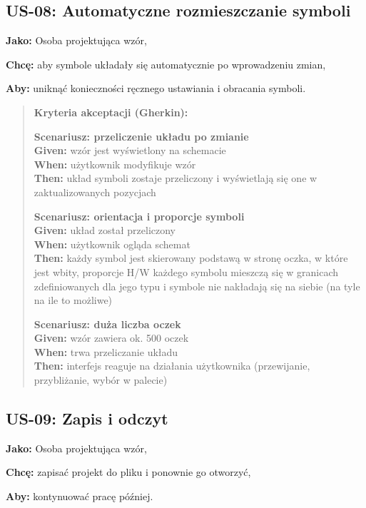 \documentclass[a4paper,11pt]{article}
\begin{document}
\subsection*{\textbf{US-08: Automatyczne rozmieszczanie symboli}}

\noindent\textbf{Jako:} Osoba projektująca wzór,\par
\noindent\textbf{Chcę:} aby symbole układały się automatycznie po wprowadzeniu zmian,\par
\noindent\textbf{Aby:} uniknąć konieczności ręcznego ustawiania i obracania symboli.\par

\begin{quote}
\textbf{Kryteria akceptacji (Gherkin):}

\textbf{Scenariusz: przeliczenie układu po zmianie} \\
\textbf{Given:} wzór jest wyświetlony na schemacie \\
\textbf{When:} użytkownik modyfikuje wzór \\
\textbf{Then:} układ symboli zostaje przeliczony i wyświetlają się one w zaktualizowanych pozycjach

\textbf{Scenariusz: orientacja i proporcje symboli} \\
\textbf{Given:} układ został przeliczony \\
\textbf{When:} użytkownik ogląda schemat \\
\textbf{Then:} każdy symbol jest skierowany podstawą w stronę oczka, w które jest wbity, proporcje H/W każdego symbolu mieszczą się w granicach zdefiniowanych dla jego typu i symbole nie nakładają się na siebie (na tyle na ile to możliwe)

\textbf{Scenariusz: duża liczba oczek} \\
\textbf{Given:} wzór zawiera ok. 500 oczek \\
\textbf{When:} trwa przeliczanie układu \\
\textbf{Then:} interfejs reaguje na działania użytkownika (przewijanie, przybliżanie, wybór w palecie)
\end{quote}

\subsection*{\textbf{US-09: Zapis i odczyt}}

\noindent\textbf{Jako:} Osoba projektująca wzór,\par
\noindent\textbf{Chcę:} zapisać projekt do pliku i ponownie go otworzyć,\par
\noindent\textbf{Aby:} kontynuować pracę później.\par
\end{document}
